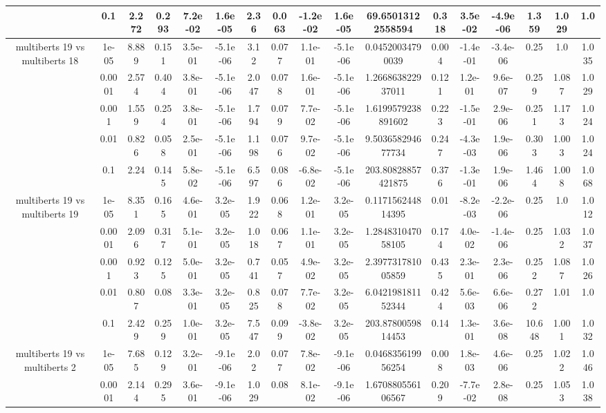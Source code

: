 \begin{tabular}{|c|c|c|c|c|c|c|c|c|c|c|c|c|c|c|c|c|}
 & 0.1 & 2.272 & 0.293 & 7.2e-02 & 1.6e-05 & 2.36 & 0.063 & -1.2e-02 & 1.6e-05 & 69.65013122558594 & 0.318 & 3.5e-02 & -4.9e-06 & 1.359 & 1.029 & 1.0 \\
\hline
\multirow{5}{*}{multiberts 19 vs multiberts 18} & 1e-05 & 8.889 & 0.151 & 3.5e-01 & -5.1e-06 & 3.12 & 0.077 & 1.1e-01 & -5.1e-06 & 0.04520034790039 & 0.004 & -1.4e-01 & -3.4e-06 & 0.25 & 1.0 & 1.035 \\
 & 0.0001 & 2.574 & 0.404 & 3.8e-01 & -5.1e-06 & 2.047 & 0.078 & 1.6e-01 & -5.1e-06 & 1.266863822937011 & 0.121 & 1.2e-01 & 9.6e-07 & 0.259 & 1.087 & 1.029 \\
 & 0.001 & 1.559 & 0.254 & 3.8e-01 & -5.1e-06 & 1.794 & 0.079 & 7.7e-02 & -5.1e-06 & 1.6199579238891602 & 0.223 & -1.5e-01 & 2.9e-06 & 0.251 & 1.173 & 1.024 \\
 & 0.01 & 0.826 & 0.058 & 2.5e-01 & -5.1e-06 & 1.198 & 0.076 & 9.7e-02 & -5.1e-06 & 9.503658294677734 & 0.247 & -4.3e-03 & 1.9e-06 & 0.303 & 1.003 & 1.024 \\
 & 0.1 & 2.24 & 0.145 & 5.8e-02 & -5.1e-06 & 6.597 & 0.086 & -6.8e-02 & -5.1e-06 & 203.80828857421875 & 0.376 & -1.3e-01 & 1.9e-06 & 1.464 & 1.008 & 1.068 \\
\hline
\multirow{5}{*}{multiberts 19 vs multiberts 19} & 1e-05 & 8.351 & 0.165 & 4.6e-01 & 3.2e-05 & 1.922 & 0.068 & 1.2e-01 & 3.2e-05 & 0.117156244814395 & 0.01 & -8.2e-03 & -2.2e-06 & 0.25 & 1.0 & 1.012 \\
 & 0.0001 & 2.096 & 0.317 & 5.1e-01 & 3.2e-05 & 1.018 & 0.067 & 1.1e-01 & 3.2e-05 & 1.284831047058105 & 0.174 & 4.0e-02 & -1.4e-06 & 0.25 & 1.032 & 1.037 \\
 & 0.001 & 0.923 & 0.125 & 5.0e-01 & 3.2e-05 & 0.741 & 0.057 & 4.9e-02 & 3.2e-05 & 2.397731781005859 & 0.435 & 2.3e-01 & 2.3e-06 & 0.252 & 1.087 & 1.026 \\
 & 0.01 & 0.807 & 0.08 & 3.3e-01 & 3.2e-05 & 0.825 & 0.078 & 7.7e-02 & 3.2e-05 & 6.042198181152344 & 0.424 & 5.6e-03 & 6.6e-06 & 0.272 & 1.01 & 1.0 \\
 & 0.1 & 2.429 & 0.259 & 1.0e-01 & 3.2e-05 & 7.547 & 0.099 & -3.8e-02 & 3.2e-05 & 203.8780059814453 & 0.14 & 1.3e-01 & 3.6e-08 & 10.648 & 1.001 & 1.032 \\
\hline
\multirow{5}{*}{multiberts 19 vs multiberts 2} & 1e-05 & 7.685 & 0.129 & 3.2e-01 & -9.1e-06 & 2.02 & 0.077 & 7.8e-02 & -9.1e-06 & 0.046835619956254 & 0.008 & 1.8e-03 & 4.6e-06 & 0.25 & 1.022 & 1.046 \\
 & 0.0001 & 2.144 & 0.295 & 3.6e-01 & -9.1e-06 & 1.029 & 0.08 & 8.1e-02 & -9.1e-06 & 1.670880556106567 & 0.209 & -7.7e-02 & 2.8e-08 & 0.25 & 1.053 & 1.038 \\

\end{tabular}
